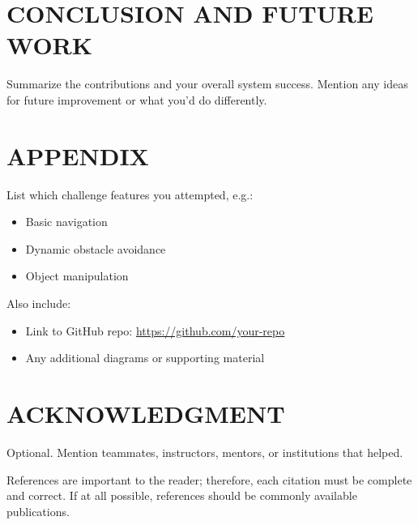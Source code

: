 \documentclass[letterpaper, 10 pt, conference]{ieeeconf}  %
\begin{document}
\section{CONCLUSION AND FUTURE WORK}
Summarize the contributions and your overall system success. Mention any ideas for future improvement or what you'd do differently.







\section*{APPENDIX}

List which challenge features you attempted, e.g.:
\begin{itemize}
    \item Basic navigation
    \item Dynamic obstacle avoidance
    \item Object manipulation
\end{itemize}

Also include:
\begin{itemize}
    \item Link to GitHub repo: \url{https://github.com/your-repo}
    \item Any additional diagrams or supporting material
\end{itemize}

\section*{ACKNOWLEDGMENT}

Optional. Mention teammates, instructors, mentors, or institutions that helped.



References are important to the reader; therefore, each citation must be complete and correct. If at all possible, references should be commonly available publications.



\end{document}

